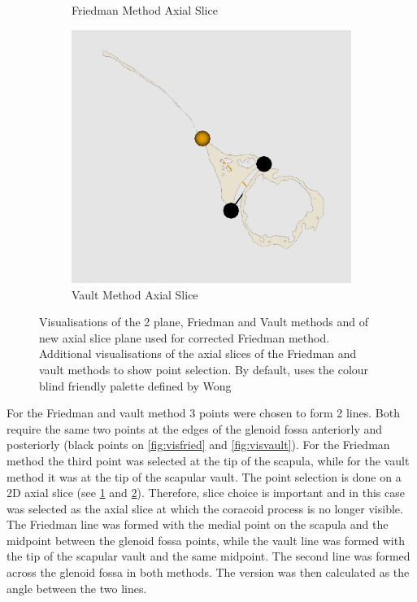 \begin{figure}
\begin{center}
\begin{subfigure}[b]{0.31\linewidth}
			\caption{\label{fig:visfried2D}Friedman Method Axial Slice}
		\end{subfigure}	
                \begin{subfigure}[b]{0.31\linewidth}
			\includegraphics[width=\linewidth]{figures/vault_vis2D.png}
			\caption{\label{fig:visvault2D}Vault Method Axial Slice}
		\end{subfigure}	
	\end{center}
	\caption{\label{fig:visualisations}Visualisations of the 2 plane, Friedman and Vault methods and of new axial slice plane used for corrected Friedman method. Additional visualisations of the axial slices of the Friedman and vault methods to show point selection. By default, \sksglenoid uses the colour blind friendly palette defined by Wong\cite{bang2011}}
\end{figure}

For the Friedman and vault method 3 points were chosen to form 2 lines. Both require the same two points at the edges of the glenoid fossa anteriorly and posteriorly (black points on \ref{fig:visfried} and \ref{fig:visvault}). For the Friedman method the third point was selected at the tip of the scapula, while for the vault method it was at the tip of the scapular vault. The point selection is done on a 2D axial slice (see \ref{fig:visfried2D} and \ref{fig:visvault2D}). Therefore, slice choice is important and in this case was selected as the axial slice at which the coracoid process is no longer visible. The Friedman line was formed with the medial point on the scapula and the midpoint between the glenoid fossa points, while the vault line was formed with the tip of the scapular vault and the same midpoint. The second line was formed across the glenoid fossa in both methods. The version was then calculated as the angle between the two lines. 

